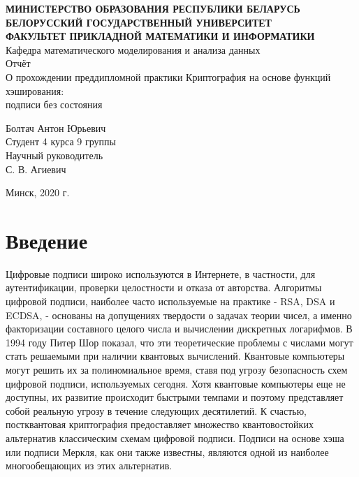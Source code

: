 \documentclass[a4paper, 14pt]{extarticle}
\begin{document}

\begin{center}
    \normalsize{\textbf{МИНИСТЕРСТВО ОБРАЗОВАНИЯ РЕСПУБЛИКИ БЕЛАРУСЬ}}\\
    \hfill \break
    \normalsize{\textbf{БЕЛОРУССКИЙ ГОСУДАРСТВЕННЫЙ УНИВЕРСИТЕТ}}\\
    \hfill \break
    \small{\textbf{ФАКУЛЬТЕТ ПРИКЛАДНОЙ МАТЕМАТИКИ И ИНФОРМАТИКИ}}\\
    \hfill \break
    \large{Кафедра математического моделирования и анализа данных}\\
    \vspace{40mm}
    \normalsize{Отчёт}\\
    \hfill \break
    \normalsize{О прохождении преддипломной практики}
    \hfill \break
    \normalsize{Криптография на основе функций хэширования:\\ подписи без состояния}\\
    \hfill \break
\end{center}

\begin{flushright}
    \vspace{20mm}
    Болтач Антон Юрьевич\\
    Студент 4 курса 9 группы\\
    Научный руководитель\\
    С. В. Агиевич\\
\end{flushright}

\vfill
\begin{center}
    Минск, 2020 г.
\end{center}
\thispagestyle{empty} %
    

\newpage

\tableofcontents
\newpage

\section{Введение}
Цифровые подписи широко используются в Интернете, в частности, для аутентификации, проверки целостности и отказа от авторства. Алгоритмы цифровой подписи, наиболее часто используемые на практике - RSA, DSA и ECDSA, - основаны на допущениях твердости о задачах теории чисел, а именно факторизации составного целого числа и вычислении дискретных логарифмов. В 1994 году Питер Шор показал, что эти теоретические проблемы с числами могут стать решаемыми при наличии квантовых вычислений. Квантовые компьютеры могут решить их за полиномиальное время, ставя под угрозу безопасность схем цифровой подписи, используемых сегодня. Хотя квантовые компьютеры еще не доступны, их развитие происходит быстрыми темпами и поэтому представляет собой реальную угрозу в течение следующих десятилетий. К счастью, постквантовая криптография предоставляет множество квантовостойких альтернатив классическим схемам цифровой подписи. Подписи на основе хэша или подписи Меркля, как они также известны, являются одной из наиболее многообещающих из этих альтернатив.
\end{document}

